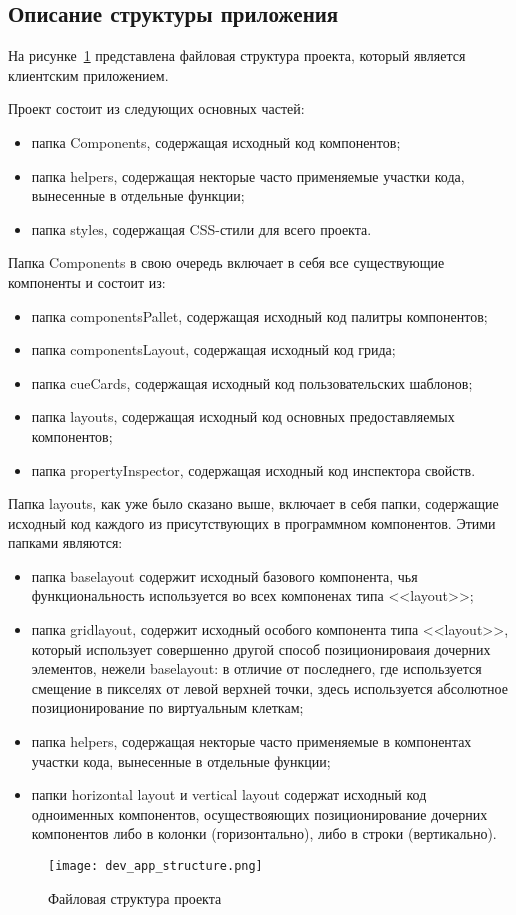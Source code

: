 \subsection{Описание структуры приложения}
\label{sec:development:app_structure}

На рисунке~\ref{sec:development:app_structure_pic} представлена файловая структура проекта, который является клиентским приложением.

Проект состоит из следующих основных частей:

\begin{itemize}
    \item папка Components, содержащая исходный код компонентов;
    \item папка helpers, содержащая некторые часто применяемые участки кода, вынесенные в отдельные функции;
    \item папка styles, содержащая CSS-стили для всего проекта.
\end{itemize}

Папка Components в свою очередь включает в себя все существующие компоненты и состоит из:

\begin{itemize}
    \item папка componentsPallet, содержащая исходный код палитры компонентов;
    \item папка componentsLayout, содержащая исходный код грида;
    \item папка cueCards, содержащая исходный код пользовательских шаблонов;
    \item папка layouts, содержащая исходный код основных предоставляемых компонентов;
    \item папка propertyInspector, содержащая исходный код инспектора свойств.
\end{itemize}

Папка layouts, как уже было сказано выше, включает в себя папки, содержащие исходный код каждого из присутствующих в программном компонентов. Этими папками являются:

\begin{itemize}
    \item папка baselayout содержит исходный базового компонента, чья функциональность используется во всех компоненах типа <<layout>>;
    \item папка gridlayout, содержит исходный особого компонента типа <<layout>>, который использует совершенно другой способ позиционироваия дочерних элементов, нежели baselayout: в отличие от последнего, где используется смещение в пикселях от левой верхней точки, здесь используется абсолютное позиционирование по виртуальным клеткам;
    \item папка helpers, содержащая некторые часто применяемые в компонентах участки кода, вынесенные в отдельные функции;
    \item папки horizontal layout и vertical layout содержат исходный код одноименных компонентов, осуществояющих позиционирование дочерних компонентов либо в колонки (горизонтально), либо в строки (вертикально).
\end{itemize}

\begin{figure}[ht]
\centering
    \texttt{[image: dev\_app\_structure.png]}
    \caption{Файловая структура проекта}
    \label{sec:development:app_structure_pic}
\end{figure}
    